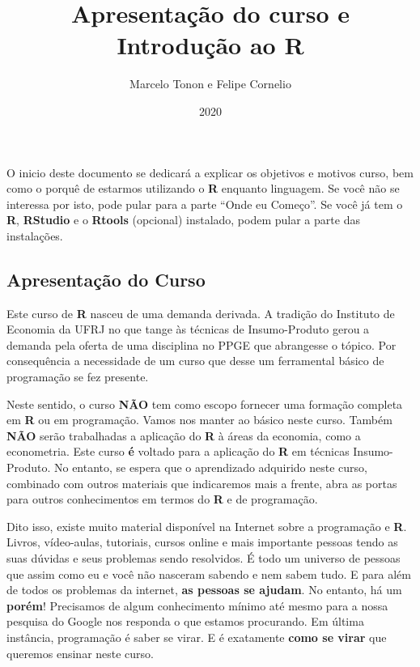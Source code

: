 \documentclass[
]{article}
\title{Apresentação do curso e Introdução ao R}
\author{Marcelo Tonon e Felipe Cornelio}
\date{2020}
\begin{document}
\maketitle

O inicio deste documento se dedicará a explicar os objetivos e motivos
curso, bem como o porquê de estarmos utilizando o \textbf{R} enquanto
linguagem. Se você não se interessa por isto, pode pular para a parte
``Onde eu Começo''. Se você já tem o \textbf{R}, \textbf{RStudio} e o
\textbf{Rtools} (opcional) instalado, podem pular a parte das
instalações.

\hypertarget{apresentauxe7uxe3o-do-curso}{%
\subsection{Apresentação do Curso}\label{apresentauxe7uxe3o-do-curso}}

Este curso de \textbf{R} nasceu de uma demanda derivada. A tradição do
Instituto de Economia da UFRJ no que tange às técnicas de Insumo-Produto
gerou a demanda pela oferta de uma disciplina no PPGE que abrangesse o
tópico. Por consequência a necessidade de um curso que desse um
ferramental básico de programação se fez presente.

Neste sentido, o curso \textbf{NÃO} tem como escopo fornecer uma
formação completa em \textbf{R} ou em programação. Vamos nos manter ao
básico neste curso. Também \textbf{NÃO} serão trabalhadas a aplicação do
\textbf{R} à áreas da economia, como a econometria. Este curso
\textbf{é} voltado para a aplicação do \textbf{R} em técnicas
Insumo-Produto. No entanto, se espera que o aprendizado adquirido neste
curso, combinado com outros materiais que indicaremos mais a frente,
abra as portas para outros conhecimentos em termos do \textbf{R} e de
programação.

Dito isso, existe muito material disponível na Internet sobre a
programação e \textbf{R}. Livros, vídeo-aulas, tutoriais, cursos online
e mais importante pessoas tendo as suas dúvidas e seus problemas sendo
resolvidos. É todo um universo de pessoas que assim como eu e você não
nasceram sabendo e nem sabem tudo. E para além de todos os problemas da
internet, \textbf{as pessoas se ajudam}. No entanto, há um
\textbf{porém}! Precisamos de algum conhecimento mínimo até mesmo para a
nossa pesquisa do Google nos responda o que estamos procurando. Em
última instância, programação é saber se virar. E é exatamente
\textbf{como se virar} que queremos ensinar neste curso.
\end{document}
